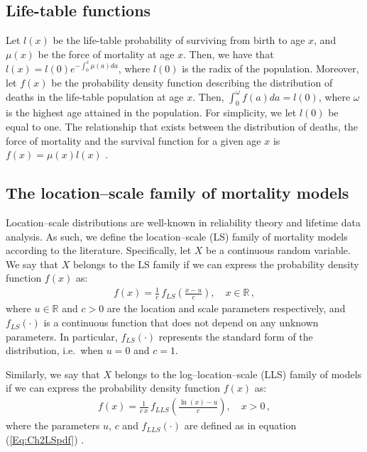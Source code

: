 \documentclass[Thesis]{subfiles}
\begin{document}
\subsection{Life-table functions}
\label{Subsec:Ch2subsec2.1}
Let $l(x)$ be the life-table probability of surviving from birth to age $x$, and $\mu (x)$ be the force of mortality at age $x$. Then, we have that $l(x)=l(0)e^{- \int_{0}^{x} \mu (a)da}$, where $l(0)$ is the radix of the population. Moreover, let $f(x)$ be the probability density function describing the distribution of deaths in the life-table population at age $x$. Then, $\int_{0}^{\omega}f(a)da=l(0)$, where $\omega$ is the highest age attained in the population. For simplicity, we let $l(0)$ be equal to one. The relationship that exists between the distribution of deaths, the force of mortality and the survival function for a given age $x$ is $f(x)=\mu (x)l(x)$ \citep{preston2001demogr}.


\subsection{The location--scale family of mortality models}
\label{Subsec:Ch2subsec2.2}

Location--scale distributions are well-known in reliability theory and lifetime data analysis. As such, we define the location--scale (LS) family of mortality models according to the literature. Specifically, let $X$ be a continuous random variable. We say that $X$ belongs to the LS family if we can express the probability density function $f(x)$ as: 
\begin{eqnarray}\label{Eq:Ch2LSpdf}
f(x)= \frac{1}{c} \, f_{LS} \left (\frac{x-u}{c} \right ), \quad x\in\mathbb{R} \, ,
\end{eqnarray}
where $u \in \mathbb{R}$ and $c > 0 $ are the location and scale parameters respectively, and $f_{LS}(\cdot)$ is a continuous function that does not depend on any unknown parameters. In particular, $f_{LS}(\cdot)$ represents the standard form of the distribution, i.e.~when $u=0$ and $c=1$.

Similarly, we say that $X$ belongs to the log--location--scale (LLS) family of models if we can express the probability density function $f(x)$ as: 
\begin{eqnarray}\label{Eq:Ch2LSLpdf}
f(x)=\frac{1}{c\,x} \, f_{LLS} \left (\frac{\ln(x)-u}{c} \right ),  \quad x>0 \, ,
\end{eqnarray}
where the parameters $u$, $c$ and $f_{LLS}(\cdot)$ are defined as in equation (\ref{Eq:Ch2LSpdf}) \citep{mukhopadhyay2000probability,lawless2011statistical,meeker2014statistical}.
\end{document}
